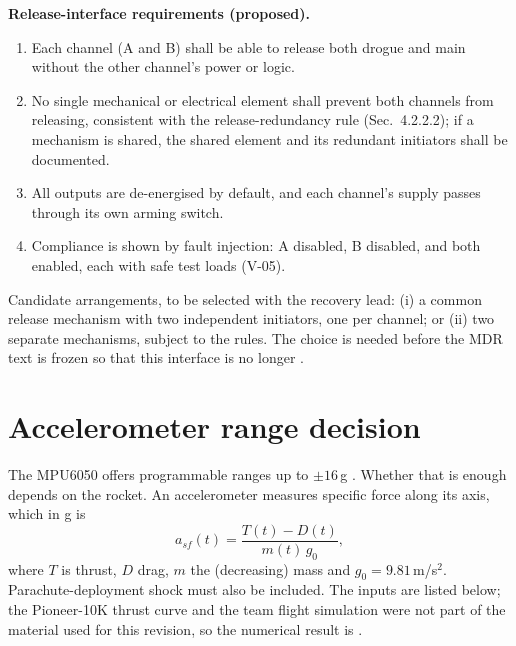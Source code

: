 \textbf{Release-interface requirements (proposed).}
\begin{enumerate}[label=R\arabic*.]
\item Each channel (A and B) shall be able to release both drogue and main without the other channel's power or logic.
\item No single mechanical or electrical element shall prevent both channels from releasing, consistent with the release-redundancy rule \cite{rtc2027app03} (Sec.~4.2.2.2); if a mechanism is shared, the shared element and its redundant initiators shall be documented.
\item All outputs are de-energised by default, and each channel's supply passes through its own arming switch.
\item Compliance is shown by fault injection: A disabled, B disabled, and both enabled, each with safe test loads (V-05).
\end{enumerate}
Candidate arrangements, to be selected with the recovery lead: (i) a common release mechanism with two independent initiators, one per channel; or (ii) two separate mechanisms, subject to the rules. The choice is needed before the MDR text is frozen so that this interface is no longer .

\section{Accelerometer range decision}
\label{sec:accel}
The MPU6050 offers programmable ranges up to $\pm16$\,g \cite{mpu6050ds}. Whether that is enough depends on the rocket. An accelerometer measures specific force along its axis, which in g is
\begin{equation}
a_{sf}(t)=\frac{T(t)-D(t)}{m(t)\,g_0},
\end{equation}
where $T$ is thrust, $D$ drag, $m$ the (decreasing) mass and $g_0=9.81$\,m/s$^2$. Parachute-deployment shock must also be included. The inputs are listed below; the Pioneer-10K thrust curve and the team flight simulation were not part of the material used for this revision, so the numerical result is .

